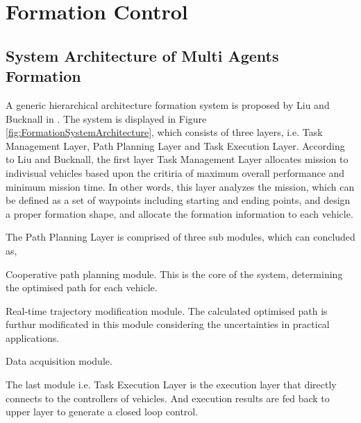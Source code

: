 \documentclass[letterpaper,12pt]{article}
\begin{document}
\section{Formation Control}

\subsection{System Architecture of Multi Agents Formation}

A generic hierarchical architecture formation system is proposed by Liu and Bucknall in \cite{LIU2015126}. The system is displayed in Figure \ref{fig:FormationSystemArchitecture}, which consists of three layers, i.e. Task Management Layer, Path Planning Layer and Task Execution Layer. According to Liu and Bucknall, the first layer Task Management Layer allocates mission to indivisual vehicles based upon the critiria of maximum overall performance and minimum mission time. In other words, this layer analyzes the mission, which can be defined as a set of waypoints including starting and ending points, and design a proper formation shape, and allocate the formation information to each vehicle.

The Path Planning Layer is comprised of three sub modules, which can concluded as,

\begin{compactenum}
	\item Cooperative path planning module. This is the core of the system, determining the optimised path for each vehicle.
	\item Real-time trajectory modification module. The calculated optimised path is furthur modificated in this module considering the uncertainties in practical applications.
	\item Data acquisition module.
\end{compactenum}

The last module i.e. Task Execution Layer is the execution layer that directly connects to the controllers of vehicles. And execution results are fed back to upper layer to generate a closed loop control.
\end{document}
